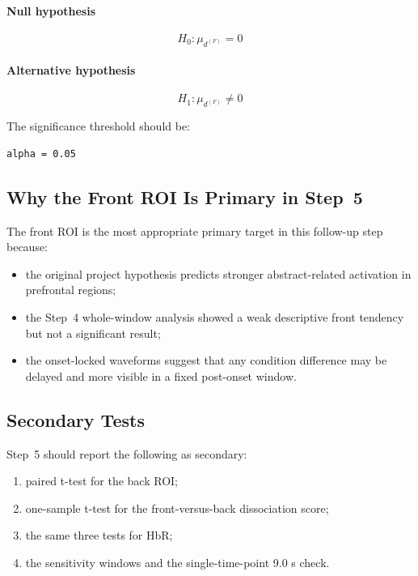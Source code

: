 \documentclass[11pt]{article}
\begin{document}
\paragraph{Null hypothesis}
\begin{equation}
H_0: \mu_{d^{(F)}} = 0
\end{equation}

\paragraph{Alternative hypothesis}
\begin{equation}
H_1: \mu_{d^{(F)}} \neq 0
\end{equation}

The significance threshold should be:
\begin{verbatim}
alpha = 0.05
\end{verbatim}

\subsection{Why the Front ROI Is Primary in Step~5}
The front ROI is the most appropriate primary target in this follow-up step because:
\begin{itemize}
    \item the original project hypothesis predicts stronger abstract-related activation in prefrontal regions;
    \item the Step~4 whole-window analysis showed a weak descriptive front tendency but not a significant result;
    \item the onset-locked waveforms suggest that any condition difference may be delayed and more visible
    in a fixed post-onset window.
\end{itemize}

\subsection{Secondary Tests}
Step~5 should report the following as secondary:
\begin{enumerate}
    \item paired t-test for the back ROI;
    \item one-sample t-test for the front-versus-back dissociation score;
    \item the same three tests for HbR;
    \item the sensitivity windows and the single-time-point 9.0 s check.
\end{enumerate}
\end{document}
